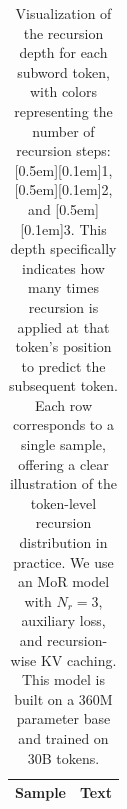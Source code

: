 
\begin{table}[ht]
\centering
\footnotesize
\caption{Visualization of the recursion depth for each subword token, with colors representing the number of recursion steps: \raisebox{0pt}[0.5em][0.1em]{\colorbox{DarkOrchid!25}{1}}, \raisebox{0pt}[0.5em][0.1em]{\colorbox{SkyBlue!55}{2}}, and \raisebox{0pt}[0.5em][0.1em]{\colorbox{Salmon!60}{3}}. This depth specifically indicates how many times recursion is applied at that token's position to predict the subsequent token. Each row corresponds to a single sample, offering a clear illustration of the token-level recursion distribution in practice. We use an MoR model with $N_r = 3$, auxiliary loss, and recursion-wise KV caching. This model is built on a 360M parameter base and trained on 30B tokens.
}
\begin{tabular}{@{}l p{13cm}@{}}
\toprule
\textbf{Sample} & \textbf{Text} \\
\midrule


\end{tabular}
\end{table}
